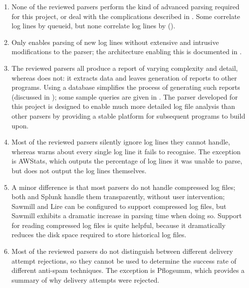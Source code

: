 \begin{enumerate}

    \item None of the reviewed parsers perform the kind of advanced parsing
        required for this project, or deal with the complications described
        in .  Some correlate log lines by
        queueid, but none correlate log lines by 
        ().

    \item Only \parsername{} enables parsing of new log lines without
        extensive and intrusive modifications to the parser; the
        architecture enabling this is documented in .

    \item The reviewed parsers all produce a report of varying complexity
        and detail, whereas \parsername{} does not: it extracts data and
        leaves generation of reports to other programs.  Using a
         database simplifies the process of generating such
        reports (discussed in ); some sample
        queries are given in .  The parser developed
        for this project is designed to enable much more detailed log file
        analysis than other parsers by providing a stable platform for
        subsequent programs to build upon.

    \item Most of the reviewed parsers silently ignore log lines they
        cannot handle, whereas \parsername{} warns about every single log
        line it fails to recognise.  The exception is AWStats, which
        outputs the percentage of log lines it was unable to parse, but
        does not output the log lines themselves.

    \item A minor difference is that most parsers do not handle compressed
        log files; both \parsername{} and Splunk handle them transparently,
        without user intervention; Sawmill and Lire can be configured to
        support compressed log files, but Sawmill exhibits a dramatic
        increase in parsing time when doing so.  Support for reading
        compressed log files is quite helpful, because it dramatically
        reduces the disk space required to store historical log files.

    \item Most of the reviewed parsers do not distinguish between different
        delivery attempt rejections, so they cannot be used to determine
        the success rate of different anti-spam techniques.  The exception
        is Pflogsumm, which provides a summary of why delivery attempts
        were rejected.

\end{enumerate}

